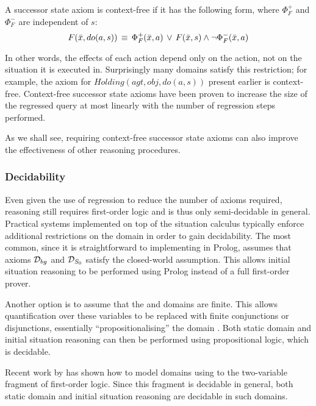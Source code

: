 \begin{defnL}
 A successor state
axiom is context-free if it has the following form, where $\Phi_{F}^{+}$
and $\Phi_{F}^{-}$ are independent of $s$:\[
F(\bar{x},do(a,s))\,\equiv\,\Phi_{F}^{+}(\bar{x},a)\,\vee\, F(\bar{x},s)\wedge\neg\Phi_{F}^{-}(\bar{x},a)\]

\end{defnL}
In other words, the effects of each action depend only on the action,
not on the situation it is executed in. Surprisingly many domains
satisfy this restriction; for example, the axiom for $Holding(agt,obj,do(a,s))$
present earlier is context-free. Context-free successor state axioms
have been proven to increase the size of the regressed query at most
linearly with the number of regression steps performed.

As we shall see, requiring context-free successor state axioms can
also improve the effectiveness of other reasoning procedures.


\subsubsection{Decidability}

Even given the use of regression to reduce the number of axioms required,
reasoning still requires first-order logic and is thus only semi-decidable
in general. Practical systems implemented on top of the situation
calculus typically enforce additional restrictions on the domain in
order to gain decidability. The most common, since it is straightforward
to implementing in Prolog, assumes that axioms $\mathcal{D}_{bg}$ and $\mathcal{D}_{S_{0}}$
satisfy the closed-world assumption. This allows initial situation
reasoning to be performed using Prolog instead of a full first-order
prover.

Another option is to assume that the  and 
domains are finite. This allows quantification over these variables
to be replaced with finite conjunctions or disjunctions, essentially
{}``propositionalising'' the domain \citep{giacomo99impl_robots,levesque04krr_book}.
Both static domain and initial situation reasoning can then be performed
using propositional logic, which is decidable.

Recent work by \citet{yu07twovar_sitcalc} has shown how to model
domains using to the two-variable fragment of first-order logic. Since
this fragment is decidable in general, both static domain and initial
situation reasoning are decidable in such domains.


